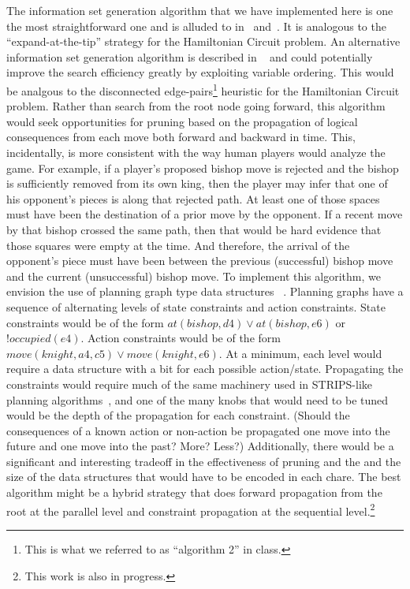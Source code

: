 \documentclass[11pt]{article}
\begin{document}
The information set generation algorithm that we have implemented here is one the most straightforward one and is
alluded to in~\cite{parker05game} and~\cite{russell05efficient}.  It is analogous to the ``expand-at-the-tip'' strategy
for the Hamiltonian Circuit problem.  An alternative information set generation algorithm is described in
~\cite{richards09information} and could potentially improve the search efficiency greatly by exploiting variable
ordering.  This would be analgous to the disconnected edge-pairs\footnote{This is what we referred to as ``algorithm 2'' in
class.} heuristic for the Hamiltonian Circuit problem.  Rather than search from the root node going forward, this
algorithm would seek opportunities for pruning based on the propagation of logical consequences from each move both
forward and backward in time.  This, incidentally, is more consistent with the way human players would analyze the game.
For example, if a player's proposed bishop move is rejected and the bishop is sufficiently removed from its own king,
then the player may infer that one of his opponent's pieces is along that rejected path.  At least one of those spaces
must have been the destination of a prior move by the opponent.  If a recent move by that bishop crossed the same path,
then that would be hard evidence that those squares were empty at the time.  And therefore, the arrival of the
opponent's piece must have been between the previous (successful) bishop move and the current (unsuccessful) bishop
move.  To implement this algorithm, we envision the use of planning graph type data structures ~\cite{blum97fast}.
Planning graphs have a sequence of alternating levels of state constraints and action constraints.  State constraints
would be of the form $at(bishop,d4) \vee at(bishop,e6)$ or $!occupied(e4)$.  Action constraints would be of the form
$move(knight,a4,c5) \vee move(knight,e6)$.  At a minimum, each level would require a data structure with a bit for each
possible action/state.  Propagating the constraints would require much of the same machinery used in STRIPS-like
planning algorithms~\cite{chen05solving}, and one of the many knobs that would need to be tuned would be the depth of the
propagation for each constraint.  (Should the consequences of a known action or non-action be propagated one move into
the future and one move into the past?  More?  Less?)  Additionally, there would be a significant and interesting
tradeoff in the effectiveness of pruning and the and the size of the data structures that would have to be encoded in
each chare.  The best algorithm might be a hybrid strategy that does forward propagation from the root at the parallel
level and constraint propagation at the sequential level.\footnote{This work is also in progress.}
\end{document}
